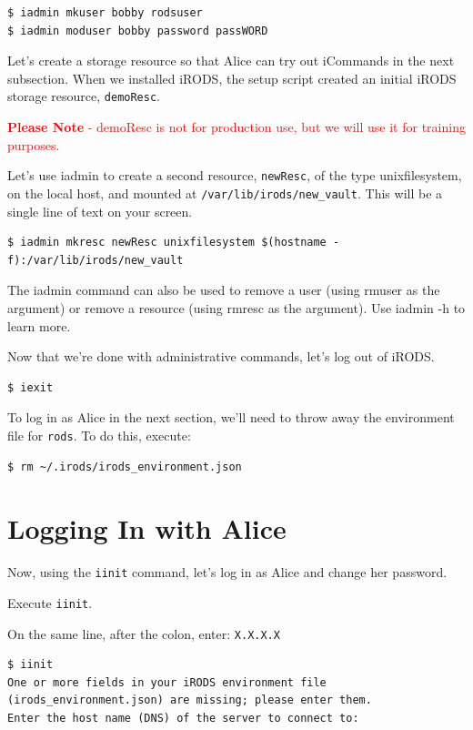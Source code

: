 \documentclass[10pt,oneside]{memoir}
\begin{document}
\begin{lstlisting}
$ iadmin mkuser bobby rodsuser
$ iadmin moduser bobby password passWORD
\end{lstlisting}

Let's create a storage resource so that Alice can try out iCommands in the next subsection. When we installed iRODS, the setup script created an initial iRODS storage resource, \texttt{demoResc}.

\textcolor{red}{\textbf{Please Note} - demoResc is not for production use, but we will use it for training purposes.}

Let's use iadmin to create a second resource, \texttt{newResc}, of the type unixfilesystem, on the local host, and mounted at \texttt{/var/lib/irods/new\_vault}. This will be a single line of text on your screen.

\begin{lstlisting}[basicstyle=\ttfamily]
$ iadmin mkresc newResc unixfilesystem $(hostname -f):/var/lib/irods/new_vault
\end{lstlisting}

The iadmin command can also be used to remove a user (using rmuser as the argument) or remove a resource (using rmresc as the argument). Use iadmin -h to learn more.

Now that we're done with administrative commands, let's log out of iRODS.

\begin{lstlisting}
$ iexit
\end{lstlisting}

To log in as Alice in the next section, we'll need to throw away the environment file for \texttt{rods}. To do this, execute:

\begin{lstlisting}
$ rm ~/.irods/irods_environment.json
\end{lstlisting}

\section{Logging In with Alice}
\label{sec:logging_in_with_alice}

Now, using the \texttt{iinit} command, let's log in as Alice and change her password.

Execute \texttt{iinit}.

On the same line, after the colon, enter: \texttt{X.X.X.X}

\begin{lstlisting}[basicstyle=\scriptsize\ttfamily]
$ iinit
One or more fields in your iRODS environment file (irods_environment.json) are missing; please enter them.
Enter the host name (DNS) of the server to connect to:
\end{lstlisting}
\end{document}
